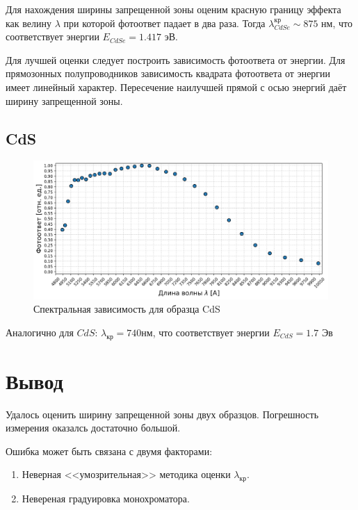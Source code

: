 \documentclass[a4paper, 14pt]{article}
\begin{document}
Для нахождения ширины запрещенной зоны оценим красную границу эффекта как велину $\lambda$ при
которой фотоответ падает в два раза. Тогда $\lambda_{CdSe}^{кр} \sim 875 \text{ нм}$, что соответствует
энергии $E_{CdSe} = 1.417 \text{ эВ}$.

Для лучшей оценки следует построить зависимость фотоответа от энергии. Для прямозонных полупроводников
зависимость квадрата фотоответа от энергии имеет линейный характер. Пересечение наилучшей прямой с осью
энергий даёт ширину запрещенной зоны.

\subsection*{\textcolor{sub_header}{CdS}}

\begin{figure}[htbp]
    \centering
    \includegraphics[width = 0.8 \textwidth]{CdS_main.png}
    
    \caption{Спектральная зависимость для образца CdS}
    \label{fig:CdS_main}
\end{figure}

Аналогично для $CdS$: $\lambda_{кр} = 740 \text{нм}$, что соответствует энергии 
$E_{CdS} = 1.7 \text{ Эв}$


\section*{\textcolor{header}{Вывод}}

Удалось оценить ширину запрещенной зоны двух образцов. Погрешность измерения 
оказалсь достаточно большой. 

Ошибка может быть связана с двумя факторами:
\begin{enumerate}
    \item Неверная <<умозрительная>> методика оценки $\lambda_{кр}$.
    \item Невереная градуировка монохроматора.
\end{enumerate}
\end{document}
